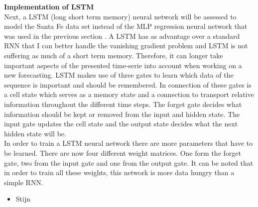 \documentclass[a4paper,10pt]{article}
\begin{document}
\textbf{Implementation of LSTM}\\
Next, a LSTM (long short term memory) neural network will be assessed to model the Santa Fe data set instead of the MLP regression neural network that was used in the previous section . A LSTM has as advantage over a standard RNN that I can better handle the vanishing gradient problem and LSTM is not suffering as much of a short term memory. Therefore, it can  longer take important aspects of the presented time-serie into account when working on a new forecasting. LSTM makes use of three gates to learn which data of the sequence is important and should be remembered. In connection of these gates is a cell state which serves as a memory state and a connection to transport relative information throughout the different time steps. The forget gate decides what information should be kept or removed from the input and hidden state. The input gate updates the cell state and the output state decides what the next hidden state will be.\\
In order to train a LSTM neural network there are more parameters that have to be learned.  There are now four different weight matrices. One form the forget gate, two from the input gate and one from the output gate. It can be noted that in order to train all these weights, this network is more data hungry than a simple RNN. 




\begin{itemize}
	\item Stijn
\end{itemize}



















%
\end{document}
